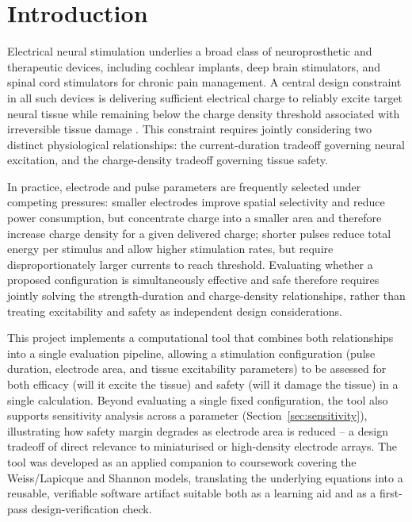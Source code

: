 \documentclass[conference]{IEEEtran}
\begin{document}
\section{Introduction}

Electrical neural stimulation underlies a broad class of neuroprosthetic and therapeutic devices, including cochlear implants, deep brain stimulators, and spinal cord stimulators for chronic pain management. A central design constraint in all such devices is delivering sufficient electrical charge to reliably excite target neural tissue while remaining below the charge density threshold associated with irreversible tissue damage \cite{shannon1992}. This constraint requires jointly considering two distinct physiological relationships: the current-duration tradeoff governing neural excitation, and the charge-density tradeoff governing tissue safety.

In practice, electrode and pulse parameters are frequently selected under competing pressures: smaller electrodes improve spatial selectivity and reduce power consumption, but concentrate charge into a smaller area and therefore increase charge density for a given delivered charge; shorter pulses reduce total energy per stimulus and allow higher stimulation rates, but require disproportionately larger currents to reach threshold. Evaluating whether a proposed configuration is simultaneously effective and safe therefore requires jointly solving the strength-duration and charge-density relationships, rather than treating excitability and safety as independent design considerations.

This project implements a computational tool that combines both relationships into a single evaluation pipeline, allowing a stimulation configuration (pulse duration, electrode area, and tissue excitability parameters) to be assessed for both efficacy (will it excite the tissue) and safety (will it damage the tissue) in a single calculation. Beyond evaluating a single fixed configuration, the tool also supports sensitivity analysis across a parameter (Section~\ref{sec:sensitivity}), illustrating how safety margin degrades as electrode area is reduced -- a design tradeoff of direct relevance to miniaturised or high-density electrode arrays. The tool was developed as an applied companion to coursework covering the Weiss/Lapicque and Shannon models, translating the underlying equations into a reusable, verifiable software artifact suitable both as a learning aid and as a first-pass design-verification check.
\end{document}

